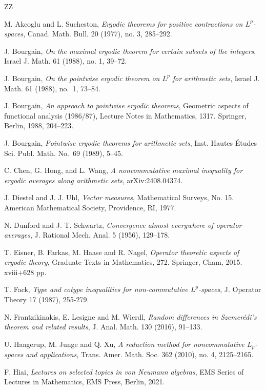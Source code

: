 \documentclass[12pt]{amsart}
\theoremstyle{remark}
\theoremstyle{definition}
\numberwithin{equation}{section}
\begin{document}
\begin{thebibliography}{ZZ}

 M. Akcoglu and L. Sucheston, {\it Ergodic theorems for positive contractions on $L^p$-spaces},
Canad. Math. Bull. 20 (1977), no. 3, 285–292.

 J. Bourgain, {\it On the maximal ergodic theorem for certain subsets of the integers},
Israel J. Math. 61 (1988), no. 1, 39–72.

 J. Bourgain,
{\it On the pointwise ergodic theorem on $L^p$ for arithmetic sets},
Israel J. Math. 61 (1988), no.~1, 73--84.

 J. Bourgain,
{\it An approach to pointwise ergodic theorems},
 Geometric aspects of functional analysis (1986/87),
Lecture Notes in Mathematics, 1317. Springer, Berlin, 1988, 204--223.

 J. Bourgain,
{\it Pointwise ergodic theorems for arithmetic sets},
Inst. Hautes \'Etudes Sci. Publ. Math. No.~69 (1989), 5--45.

 C. Chen, G. Hong, and L. Wang,
{\it A noncommutative maximal inequality for ergodic averages along arithmetic sets},
arXiv:2408.04374.

 J. Diestel and J. J. Uhl, {\it Vector measures},
Mathematical Surveys, No. 15. American Mathematical Society, Providence, RI, 1977. 

 N. Dunford and J. T. Schwartz,
{\it Convergence almost everywhere of operator averages},
J. Rational Mech. Anal. 5 (1956), 129--178.

 T. Eisner, B. Farkas, M. Haase and R. Nagel, {\it Operator theoretic aspects of ergodic theory}, 
Graduate Texts in Mathematics, 272. Springer, Cham, 2015. xviii+628 pp.

 T. Fack, {\it Type and cotype inequalities for non-commutative $L^p$-spaces},
J. Operator Theory 17 (1987), 255-279.

 N. Frantzikinakis, 
E. Lesigne and M. Wierdl,
{\it Random differences in Szemerédi's theorem and related results},
J. Anal. Math. 130 (2016), 91–133. 

  U. Haagerup, M. Junge and Q. Xu, 
{\it A reduction method for noncommutative $L_p$-spaces and applications},
Trans. Amer. Math. Soc. 362 (2010), no. 4, 2125–2165. 

 F. Hiai,  {\it Lectures on selected topics in von Neumann algebras},
EMS Series of Lectures in Mathematics, EMS Press, Berlin, 2021.


\end{thebibliography}
\end{document}
